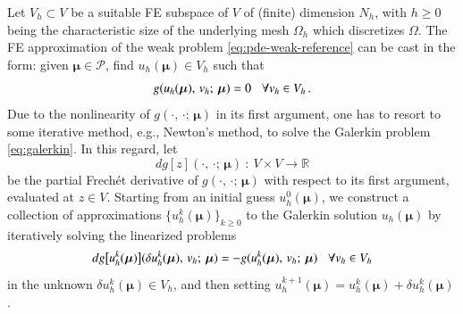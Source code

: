 \documentclass{elsarticle}
\numberwithin{equation}{section}
\theoremstyle{theorem}
\theoremstyle{definition}
\theoremstyle{remark}
\theoremstyle{proposition}
\numberwithin{figure}{section}
\newcommand{\bg}[1]{\boldsymbol{#1}}
\begin{document}
		Let $V_h \subset V$ be a suitable FE subspace of $V$ of (finite) dimension $N_h$, with $h \geq 0$ being the characteristic size of the underlying mesh $\Omega_h$ which discretizes $\Omega$. The FE approximation of the weak problem \eqref{eq:pde-weak-reference} can be cast in the form: given $\bg{\mu} \in \mathcal{P}$, find $u_h(\bg{\mu}) \in V_h$ such that 
		\begin{equation}
			\label{eq:galerkin}
			g(u_h(\bg{\mu}), \, v_h; \, \bg{\mu}) = 0 \hspace*{0.3cm} \forall v_h \in V_h \, .
		\end{equation}
		Due to the nonlinearity of $g(\cdot, \, \cdot; \, \bg{\mu})$ in its first argument, one has to resort to some iterative method, e.g., Newton's method, to solve the Galerkin problem \eqref{eq:galerkin}. In this regard, let \[ dg[z](\cdot, \, \cdot; \, \bg{\mu}) ~ : ~ V \times V \rightarrow \mathbb{R} \]
		be the partial Frech\'et derivative of $g(\cdot, \, \cdot; \, \bg{\mu})$ with respect to its first argument, evaluated at $z \in V$. Starting from an initial guess $u_h^0(\bg{\mu})$, we construct a collection of approximations $\big\lbrace u_h^k(\bg{\mu}) \big\rbrace_{k \geq 0}$ to the Galerkin solution $u_h(\bg{\mu})$ by iteratively solving the linearized problems
		\begin{equation*}
			\label{eq:newton-linearized-problem}
			dg \big[ u_h^k(\bg{\mu}) \big](\delta u_h^k(\bg{\mu}), \, v_h; \, \bg{\mu}) = - g(u_h^k(\bg{\mu}), \, v_h; \, \bg{\mu}) \hspace*{0.3cm} \forall v_h \in V_h
		\end{equation*}
		in the unknown $\delta u_h^k(\bg{\mu}) \in V_h$, and then setting $u_h^{k+1}(\bg{\mu}) = u_h^k(\bg{\mu}) + \delta u_h^k(\bg{\mu})$.
		
\end{document}
